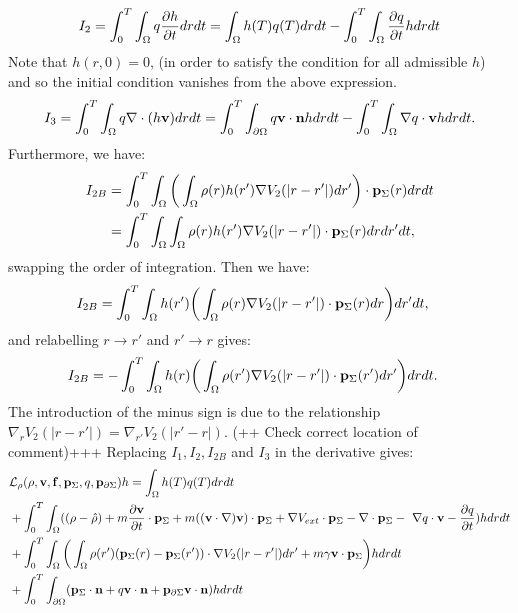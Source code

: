 \begin{align*}
I_2 = \int_0^T \int_\Omega q\frac{\partial h}{\partial t} dr dt = \int_\Omega h(T) q(T) dr dt - \int_0^T \int_\Omega  \frac{\partial q}{\partial t}h dr dt
\end{align*}
Note that ${h}(r,0)=0$, (in order to satisfy the condition for all admissible ${h}$) and so the initial condition vanishes from the above expression.
\begin{align*}
I_3= \int_0^T \int_\Omega q\nabla \cdot (h \mathbf{v}) dr dt = \int_0^T \int_{\partial \Omega} q \mathbf{v} \cdot \mathbf{n} h dr dt - \int_0^T \int_\Omega \nabla q \cdot \mathbf{v} h dr dt.
\end{align*}
Furthermore, we have:
\begin{align*}
I_{2B}&= \int_0^T \int_\Omega \bigg(\int_\Omega \rho(r) h(r') \nabla V_2(|r-r'|)dr'\bigg) \cdot \mathbf{p}_\Sigma(r) drdt\\
&=\int_0^T \int_\Omega \int_\Omega \rho(r) h(r') \nabla V_2(|r-r'|) \cdot \mathbf{p}_\Sigma(r) drdr'dt,
\end{align*}
swapping the order of integration. Then we have:
\begin{align*}
I_{2B}&= \int_0^T \int_\Omega  h(r')\bigg(\int_\Omega  \rho(r)\nabla V_2(|r-r'|) \cdot \mathbf{p}_\Sigma(r) dr \bigg)dr'dt,
\end{align*}
and relabelling $r \to r'$ and $r' \to r$ gives:
\begin{align*}
I_{2B}&= -\int_0^T \int_\Omega  h(r)\bigg(\int_\Omega  \rho(r')\nabla V_2(|r-r'|) \cdot \mathbf{p}_\Sigma(r') dr' \bigg)drdt.
\end{align*}
The introduction of the minus sign is due to the relationship $\nabla_r V_2(|r - r'|) = \nabla_{r'} V_2(|r' - r|)$.  (++ Check correct location of comment)+++
Replacing $I_1, I_2, I_{2B}$ and $I_3$ in the derivative gives:
\begin{align*}
&\mathcal{L}_\rho(\rho,\mathbf{v},\mathbf{f},\mathbf{p}_\Sigma,q,\mathbf{p}_{\partial \Sigma})h = \int_\Omega h(T) q(T) dr dt  \\
&+ \int_0^T \int_\Omega ( (\rho - \hat {\rho}) +m  \frac{\partial \mathbf{v}}{\partial t}\cdot \mathbf{p}_\Sigma + m  ((\mathbf{v} \cdot \nabla)\mathbf{v} )\cdot \mathbf{p}_\Sigma+ \nabla V_{ext}\cdot \mathbf{p}_\Sigma -\nabla\cdot \mathbf{p}_\Sigma  - \ \nabla q \cdot \mathbf{v}  -  \frac{\partial q}{\partial t}) h dr dt \\
&+ \int_0^T \int_\Omega  \bigg(\int_\Omega  \rho(r')(\mathbf{p}_\Sigma(r) - \mathbf{p}_\Sigma(r')) \cdot\nabla V_2(|r-r'|)   dr' + m \gamma \mathbf{v} \cdot \mathbf{p}_\Sigma \bigg)hdr dt\\
&+\int_0^T \int_{\partial \Omega} ( \mathbf{p}_\Sigma \cdot \mathbf{n}  +  q \mathbf{v} \cdot \mathbf{n}   +\mathbf{p}_{\partial \Sigma} \mathbf{v} \cdot \mathbf{n})h  dr dt
\end{align*}

